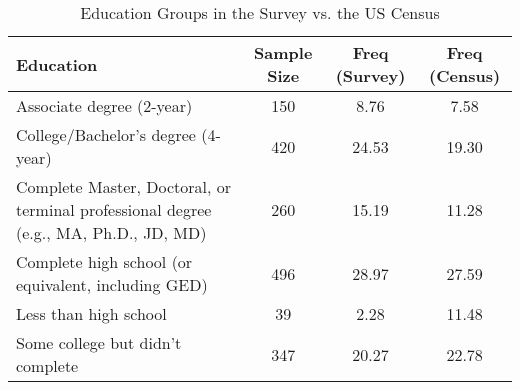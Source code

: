 \begin{table}[th!]
\centering
\caption{Education Groups in the Survey vs. the US Census}
\label{tab-03-census-educ.tex}
\begin{tabular}{p{7cm}ccc}
\toprule
                                                                           Education &  Sample Size &  Freq (Survey) &  Freq (Census) \\
\midrule
                                                           Associate degree (2-year) &          150 &           8.76 &           7.58 \\
                                                  College/Bachelor’s degree (4-year) &          420 &          24.53 &          19.30 \\
Complete Master, Doctoral, or terminal professional degree (e.g., MA, Ph.D., JD, MD) &          260 &          15.19 &          11.28 \\
                                 Complete high school (or equivalent, including GED) &          496 &          28.97 &          27.59 \\
                                                               Less than high school &           39 &           2.28 &          11.48 \\
                                                    Some college but didn't complete &          347 &          20.27 &          22.78 \\
\bottomrule
\end{tabular}
\end{table}
